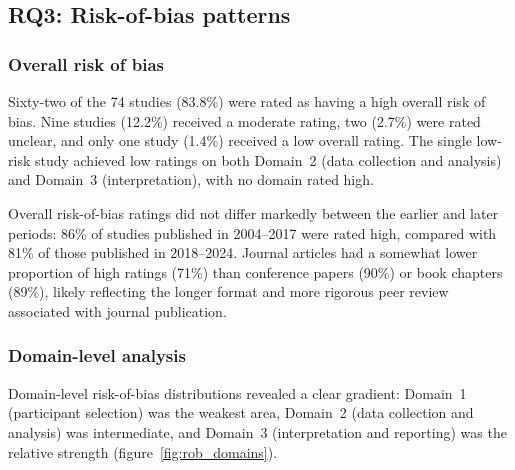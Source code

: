 \documentclass[etq]{acnsart}
\begin{document}
	
	
	\subsection{RQ3: Risk-of-bias patterns}
	\label{sec:results_rq3}
	
	\subsubsection{Overall risk of bias}
	\label{sec:results_rq3_overall}
	
	Sixty-two of the 74 studies (83.8\%) were rated as having a high overall risk of bias. Nine studies (12.2\%) received a moderate rating, two (2.7\%) were rated unclear, and only one study (1.4\%) received a low overall rating. The single low-risk study \cite{15Slater2022} achieved low ratings on both Domain~2 (data collection and analysis) and Domain~3 (interpretation), with no domain rated high.
	
	Overall risk-of-bias ratings did not differ markedly between the earlier and later periods: 86\% of studies published in 2004--2017 were rated high, compared with 81\% of those published in 2018--2024. Journal articles had a somewhat lower proportion of high ratings (71\%) than conference papers (90\%) or book chapters (89\%), likely reflecting the longer format and more rigorous peer review associated with journal publication.
	
	\subsubsection{Domain-level analysis}
	\label{sec:results_rq3_domains}
	
	Domain-level risk-of-bias distributions revealed a clear gradient: Domain~1 (participant selection) was the weakest area, Domain~2 (data collection and analysis) was intermediate, and Domain~3 (interpretation and reporting) was the relative strength (figure~\ref{fig:rob_domains}).
	
\end{document}
